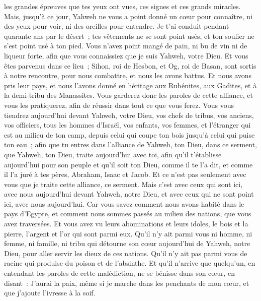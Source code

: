 \begin{multicols}{2}
les grandes épreuves que tes yeux ont vues, ces signes et ces grands miracles.
Mais, jusqu'à ce jour, Yahweh ne vous a point donné un cœur pour connaître, ni des yeux pour voir, ni des oreilles pour entendre.
Je t'ai conduit pendant quarante ans par le désert~; tes vêtements ne se sont point usés, et ton soulier ne s'est point usé à ton pied.
Vous n'avez point mangé de pain, ni bu de vin ni de liqueur forte, afin que vous connaissiez que je suis Yahweh, votre Dieu.
Et vous êtes parvenus dans ce lieu~; Sihon, roi de Hesbon, et Og, roi de Basan, sont sortis à notre rencontre, pour nous combattre, et nous les avons battus.
Et nous avons pris leur pays, et nous l'avons donné en héritage aux Rubénites, aux Gadites, et à la demi-tribu des Manassites.
Vous garderez donc les paroles de cette alliance, et vous les pratiquerez, afin de réussir dans tout ce que vous ferez.
Vous vous tiendrez aujourd'hui devant Yahweh, votre Dieu, vos chefs de tribus, vos anciens, vos officiers, tous les hommes d'Israël,
vos enfants, vos femmes, et l'étranger qui est au milieu de ton camp, depuis celui qui coupe ton bois jusqu'à celui qui puise ton eau~;
afin que tu entres dans l'alliance de Yahweh, ton Dieu, dans ce serment, que Yahweh, ton Dieu, traite aujourd'hui avec toi,
afin qu'il t'établisse aujourd'hui pour son peuple et qu'il soit ton Dieu, comme il te l'a dit, et comme il l'a juré à tes pères, Abraham, Isaac et Jacob.
Et ce n'est pas seulement avec vous que je traite cette alliance, ce serment.
Mais c'est avec ceux qui sont ici, avec nous aujourd'hui devant Yahweh, notre Dieu, et avec ceux qui ne sont point ici, avec nous aujourd'hui.
Car vous savez comment nous avons habité dans le pays d'Egypte, et comment nous sommes passés au milieu des nations, que vous avez traversées.
Et vous avez vu leurs abominations et leurs idoles, le bois et la pierre, l'argent et l'or qui sont parmi eux.
Qu'il n'y ait parmi vous ni homme, ni femme, ni famille, ni tribu qui détourne son cœur aujourd'hui de Yahweh, notre Dieu, pour aller servir les dieux de ces nations. Qu'il n'y ait pas parmi vous de racine qui produise du poison et de l'absinthe.
Et qu'il n'arrive que quelqu'un, en entendant les paroles de cette malédiction, ne se bénisse dans son cœur, en disant~: J'aurai la paix, même si je marche dans les penchants de mon cœur, et que j'ajoute l'ivresse à la soif.

\end{multicols}
